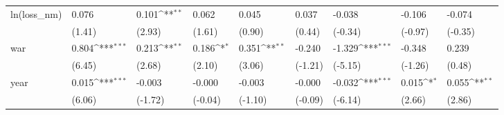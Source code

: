 \def\sym#1{\ifmmode^{#1}\else\(^{#1}\)\fi}
\begin{tabular}{p{1.5cm} p{2cm} p{1.7cm} p{1.7cm} p{1.7cm} p{1.7cm} p{1.7cm} p{1.7cm} p{1.7cm}}
\hline
ln(loss\_nm)     &    0.076         &    0.101\sym{**} &    0.062         &    0.045         &    0.037         &   -0.038         &   -0.106         &   -0.074         \\
                &   (1.41)         &   (2.93)         &   (1.61)         &   (0.90)         &   (0.44)         &  (-0.34)         &  (-0.97)         &  (-0.35)         \\
war             &    0.804\sym{***}&    0.213\sym{**} &    0.186\sym{*}  &    0.351\sym{**} &   -0.240         &   -1.329\sym{***}&   -0.348         &    0.239         \\
                &   (6.45)         &   (2.68)         &   (2.10)         &   (3.06)         &  (-1.21)         &  (-5.15)         &  (-1.26)         &   (0.48)         \\
year            &    0.015\sym{***}&   -0.003         &   -0.000         &   -0.003         &   -0.000         &   -0.032\sym{***}&    0.015\sym{*}  &    0.055\sym{**} \\
                &   (6.06)         &  (-1.72)         &  (-0.04)         &  (-1.10)         &  (-0.09)         &  (-6.14)         &   (2.66)         &   (2.86)         \\
\end{tabular}

